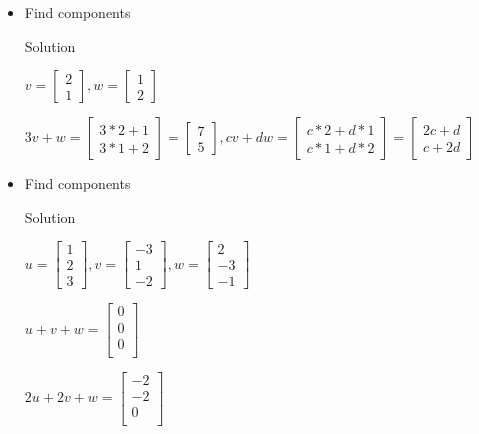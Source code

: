 \documentclass[12pt]{article}
\begin{document}
\begin{itemize}
\item[\textbf{4}] Find components

Solution

$
v = \begin{bmatrix} 2 \\ 1 \end{bmatrix}, 
w = \begin{bmatrix} 1 \\ 2 \end{bmatrix}
$

$
3v+w = \begin{bmatrix} 3*2+1 \\ 3*1+2 \end{bmatrix} = \begin{bmatrix} 7 \\ 5 \end{bmatrix}, 
cv+dw = \begin{bmatrix} c*2+d*1 \\ c*1+d*2 \end{bmatrix} = \begin{bmatrix} 2c+d \\ c+2d \end{bmatrix}
$

\item[\textbf{5}] Find components

Solution

$
u = \begin{bmatrix} 1 \\ 2 \\ 3 \end{bmatrix}, 
v = \begin{bmatrix} -3 \\ 1 \\ -2 \end{bmatrix},
w = \begin{bmatrix} 2 \\ -3 \\ -1 \end{bmatrix}
$

$
u + v + w = \begin{bmatrix} 0 \\ 0 \\ 0 \\ \end{bmatrix}
$

$
2u + 2v + w = \begin{bmatrix} -2 \\ -2 \\ 0 \\ \end{bmatrix}
$


\end{itemize}
\end{document}

